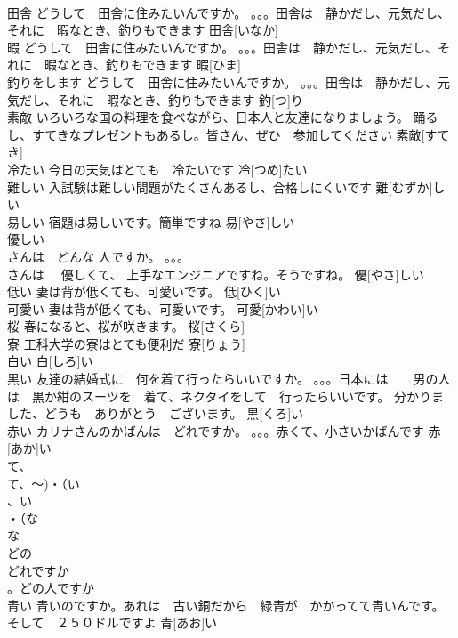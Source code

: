 \documentclass[8pt]{extreport}
\begin{document}
\begin{CJK}{UTF8}{min}
\\	田舎	どうして　田舎に住みたいんですか。 。。。田舎は　静かだし、元気だし、それに　暇なとき、釣りもできます	田舎[いなか]					
\\	暇	どうして　田舎に住みたいんですか。 。。。田舎は　静かだし、元気だし、それに　暇なとき、釣りもできます	暇[ひま]					
\\	釣りをします	どうして　田舎に住みたいんですか。 。。。田舎は　静かだし、元気だし、それに　暇なとき、釣りもできます	釣[つ]り			
\\	素敵	いろいろな国の料理を食べながら、日本人と友達になりましょう。 踊るし、すてきなプレゼントもあるし。皆さん、ぜひ　参加してください	素敵[すてき]			
\\	冷たい	今日の天気はとても　冷たいです	冷[つめ]たい			
\\	難しい	入試験は難しい問題がたくさんあるし、合格しにくいです	難[むずか]しい			
\\	易しい	宿題は易しいです。簡単ですね	易[やさ]しい			
\\	優しい	
\\	さんは　どんな 人ですか。 。。。
\\	さんは　 優しくて、 上手なエンジニアですね。そうですね。	優[やさ]しい			
\\	低い	妻は背が低くても、可愛いです。	低[ひく]い			
\\	可愛い	妻は背が低くても、可愛いです。	可愛[かわい]い			
\\	桜	春になると、桜が咲きます。	桜[さくら]			
\\	寮	工科大学の寮はとても便利だ	寮[りょう]			
\\	白い		白[しろ]い			
\\	黒い	友達の結婚式に　何を着て行ったらいいですか。 。。。日本には　　男の人は　黒か紺のスーツを　着て、ネクタイをして　行ったらいいです。 分かりました、どうも　ありがとう　ございます。	黒[くろ]い					
\\	赤い	カリナさんのかばんは　どれですか。 。。。赤くて、小さいかばんです	赤[あか]い			
\\	て、
\\	て、～)・（い
\\	、い
\\	・（な
\\	な
\\	どの
\\	どれですか　
\\	。どの人ですか 
\\	青い	青いのですか。あれは　古い銅だから　緑青が　かかってて青いんです。そして　２５０ドルですよ	青[あお]い					

\end{CJK}
\end{document}
